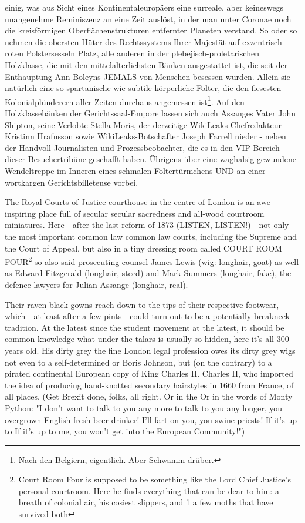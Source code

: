 \begin{multicols}{2}
{einig, was aus Sicht eines Kontinentaleuropäers eine
surreale, aber keineswegs unangenehme Reminiszenz
an eine Zeit auslöst, in der man unter Coronae noch die
kreisförmigen Oberflächenstrukturen entfernter Planeten verstand.
\textCR
So oder so nehmen die obersten Hüter des Rechtssystems Ihrer Majestät auf exzentrisch roten Polstersesseln Platz, alle anderen in der plebejisch-proletarischen
Holzklasse, die mit den mittelalterlichsten Bänken ausgestattet ist, die seit der Enthauptung Ann Boleyns JEMALS von Menschen besessen wurden. Allein sie natürlich eine so spartanische wie subtile körperliche Folter,
die den fiesesten Kolonialplünderern aller Zeiten durchaus angemessen ist\footnote[8]{Nach den Belgiern, eigentlich. Aber Schwamm drüber.}.
\textCR
Auf den Holzklassebänken der Gerichtssaal-Empore
lassen sich auch Assanges Vater John Shipton, seine Verlobte Stella Moris, der derzeitige WikiLeaks-Chefredakteur Kristinn Hrafnsson sowie WikiLeaks-Botschafter
Joseph Farrell nieder - neben der Handvoll Journalisten
und Prozessbeobachter, die es in den VIP-Bereich dieser
Besuchertribüne geschafft haben. Übrigens über eine
waghalsig gewundene Wendeltreppe im Inneren eines
schmalen Foltertürmchens UND an einer wortkargen
Gerichtsbilleteuse vorbei.}


The Royal Courts of Justice courthouse in the centre of
London is an awe-inspiring place full of secular
secular sacredness and all-wood courtroom miniatures. Here - after the last reform
of 1873 (LISTEN, LISTEN!) - not only the most important common law
common law courts, including the Supreme
and the Court of Appeal, but also in a
tiny dressing room called COURT ROOM FOUR\footnote[7]{Court Room Four is supposed to be something like the Lord Chief Justice's personal courtroom. Here he finds
everything that can be dear to him: a breath of colonial air, his cosiest slippers, and 1
a few moths that have survived both} so also said prosecuting counsel James Lewis (wig: longhair, goat) as well as Edward Fitzgerald
(longhair, steed) and Mark Summers (longhair, fake),
the defence lawyers for Julian Assange (longhair, real).

Their raven black gowns reach down to the tips
of their respective footwear, which - at least after a few pints - could turn out to be a potentially breakneck tradition. At the latest since the
student movement at the latest, it should be common knowledge what
under the talars is usually so hidden,
here it's all 300 years old. His dirty grey
the fine London legal profession owes its dirty grey wigs not even to a self-determined
or Boris Johnson, but (on the contrary) to a pirated continental European copy of King Charles II.
Charles II, who imported the idea of producing hand-knotted secondary hairstyles in 1660 from France, of all places. (Get Brexit done, folks, all right. Or in the
Or in the words of Monty Python: "I don't want to talk to you any more
to talk to you any longer, you overgrown English fresh beer drinker!
I'll fart on you, you swine priests! If it's up to
If it's up to me, you won't get into the European Community!")


\end{multicols}
